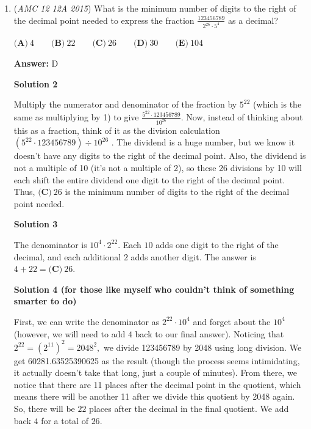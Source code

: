 \begin{enumerate}
 \textbf{Answer: }D



\textbf{Solution}

We use the change of base formula to show that
 \[\log_a b = \dfrac{\log_b b}{\log_b a} = \dfrac{1}{\log_b a}.\]Thus, our equation becomes
 \[\log_a 2 + \log_a 3 + \log_a 4 = 1,\]which becomes after combining:
 \[\log_a 24 = 1.\]

 Hence $a = 24$, and the answer is $\textbf{(D)}.$



	\item (\textit{AMC 12 12A 2015}) What is the minimum number of digits to the right of the decimal point needed to express the fraction $\frac{123456789}{2^{26}\cdot 5^4}$ as a decimal?


 $\textbf{(A)}\ 4\qquad\textbf{(B)}\ 22\qquad\textbf{(C)}\ 26\qquad\textbf{(D)}\ 30\qquad\textbf{(E)}\ 104$

 \textbf{Answer: }D



\textbf{Solution 2}

Multiply the numerator and denominator of the fraction by $5^{22}$ (which is the same as multiplying by 1) to give $\frac{5^{22} \cdot 123456789}{10^{26}}$. Now, instead of thinking about this as a fraction, think of it as the division calculation $(5^{22} \cdot 123456789) \div 10^{26}$ . The dividend is a huge number, but we know it doesn't have any digits to the right of the decimal point. Also, the dividend is not a multiple of 10 (it's not a multiple of 2), so these 26 divisions by 10 will each shift the entire dividend one digit to the right of the decimal point. Thus, $\boxed{\textbf{(C)}\ 26}$ is the minimum number of digits to the right of the decimal point needed.

 



\textbf{Solution 3}

The denominator is $10^4 \cdot 2^{22}$. Each $10$ adds one digit to the right of the decimal, and each additional $2$ adds another digit. The answer is $4 + 22 = \boxed{\textbf{(C)}\ 26}$.

 



\textbf{Solution 4 (for those like myself who couldn't think of something smarter to do)}

First, we can write the denominator as $2^{22}\cdot 10^4$ and forget about the $10^4$ (however, we will need to add $4$ back to our final answer). Noticing that $2^{22}=\left(2^{11} \right)^2=2048^2,$ we divide 123456789 by 2048 using long division. We get 60281.63525390625 as the result (though the process seems intimidating, it actually doesn't take that long, just a couple of minutes). From there, we notice that there are 11 places after the decimal point in the quotient, which means there will be another 11 after we divide this quotient by 2048 again. So, there will be $22$ places after the decimal in the final quotient. We add back $4$ for a total of $26.$





\end{enumerate}
